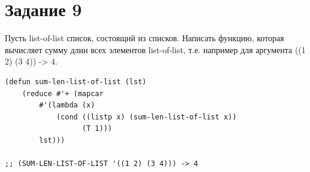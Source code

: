 \documentclass[a4paper,14pt, unknownkeysallowed]{extreport}
\begin{document}
\section{Задание 9}

Пусть list-of-list список, состоящий из списков. Написать функцию, которая вычисляет сумму длин всех элементов list-of-list, т.е. например для аргумента ((1 2) (3 4)) -> 4.

\begin{center}
\captionsetup{justification=raggedright,singlelinecheck=off}
\begin{lstlisting}[label=lst:parallel_processing,caption=Решение задания 9]
(defun sum-len-list-of-list (lst)
    (reduce #'+ (mapcar 
        #'(lambda (x)
            (cond ((listp x) (sum-len-list-of-list x))
                  (T 1))) 
        lst)))    

;; (SUM-LEN-LIST-OF-LIST '((1 2) (3 4))) -> 4
\end{lstlisting}
\end{center}
\end{document}
